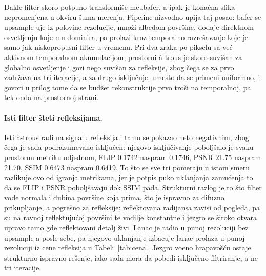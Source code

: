 Dakle filter skoro potpuno transformi\v{s}e me\dj{}ubafer, a ipak je kona\v{c}na slika
nepromenjena u okviru \v{s}uma merenja. Pipeline nizvodno upija taj posao: bafer se
upsample-uje iz polovine rezolucije, mno\v{z}i albedom povr\v{s}ine, dodaje direktnom osvetljenju koje mu dominira,
pa prolazi kroz temporalno razre\v{s}avanje koje je samo jak niskopropusni filter u vremenu. Pri dva zraka po pikselu sa
ve\'c aktivnom temporalnom akumulacijom, prostorni à-trous je skoro suvi\v{s}an za globalno
osvetljenje i gori nego suvi\v{s}an za refleksije, zbog \v{c}ega se za prvo zadr\v{z}ava na tri iteracije,
a za drugo isklju\v{c}uje, umesto da se primeni uniformno, i govori u prilog tome da se
bud\v{z}et rekonstrukcije prvo tro\v{s}i na temporalnoj, pa tek onda na prostornoj strani.

\paragraph{Isti filter \v{s}teti refleksijama.} Isti à-trous radi na signalu refleksija
i tamo se pokazao neto negativnim, zbog \v{c}ega je sada podrazumevano isklju\v{c}en: njegovo isklju\v{c}ivanje
pobolj\v{s}alo je svaku prostornu metriku odjednom, FLIP 0.1742 naspram 0.1746, PSNR 21.75 naspram 21.70, SSIM
0.6473 naspram 0.6419. To \v{s}to se sve tri pomeraju u istom smeru razlikuje ovo od igranja metrikama,
jer je potpis puko uklanjanja zamu\'cenja to da se FLIP i PSNR pobolj\v{s}avaju dok SSIM pada. Strukturni
razlog je to \v{s}to filter vode normala i dubina povr\v{s}ine koja prima, \v{s}to je ispravno
za difuzno prikupljanje, a pogre\v{s}no za refleksije: reflektovana radijansa zavisi od pogleda, pa su na
ravnoj reflektuju\'coj povr\v{s}ini te vodilje konstantne i jezgro se \v{s}iroko otvara upravo tamo gde reflektovani
detalj \v{z}ivi. Lanac je radio u punoj rezoluciji bez upsample-a posle sebe, pa njegovo uklanjanje izbacuje
lanac prolaza u punoj rezoluciji iz cene refleksija u
Tabeli~\ref{tab:cena}. Jezgro vo\dj eno hrapavo\v{s}\'cu ostaje strukturno ispravno re\v{s}enje, iako sada
mora da pobedi isklju\v{c}eno filtriranje, a ne tri iteracije.

